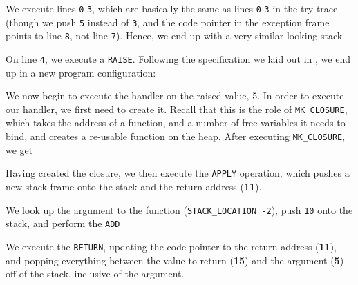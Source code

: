 \begin{center}
\end{center}

We execute lines \texttt{0}-\texttt{3}, which are basically the same as lines \texttt{0}-\texttt{3} in the \textsf{try} trace (though we push \texttt{5} instead of \texttt{3}, and the code pointer in the exception frame points to line \texttt{8}, not line \texttt{7}). Hence, we end up with a very similar looking stack

\begin{center}
\end{center}

On line \texttt{4}, we execute a \texttt{RAISE}. Following the specification we laid out in , we end up in a new program configuration:

\begin{center}
\end{center}

We now begin to execute the handler on the raised value, 5. In order to execute our handler, we first need to create it. Recall that this is the role of \texttt{MK\_CLOSURE}, which takes the address of a function, and a number of free variables it needs to bind, and creates a re-usable function on the heap. After executing \texttt{MK\_CLOSURE}, we get
\begin{center}
\end{center}

Having created the closure, we then execute the \texttt{APPLY} operation, which pushes a new stack frame onto the stack and the return address (\textbf{11}).  

\begin{center}
\end{center}

We look up the argument to the function (\texttt{STACK\_LOCATION -2}), push \texttt{10} onto the stack, and perform the \texttt{ADD}

\begin{center}
\end{center}

We execute the \texttt{RETURN}, updating the code pointer to the return address (\textbf{11}), and popping everything between the value to return (\textbf{15}) and the argument (\textbf{5}) off of the stack, inclusive of the argument.

